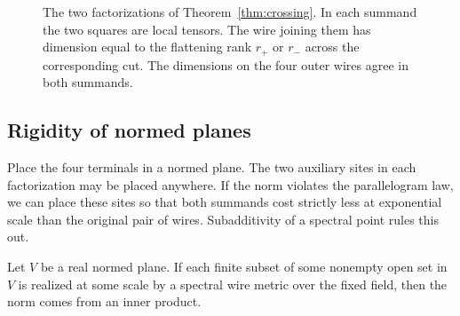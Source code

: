 \begin{figure}[htbp]
\centering
{}
\caption{The two factorizations of Theorem~\ref{thm:crossing}.
In each summand the two squares are local tensors. The wire joining
them has dimension equal to the flattening rank $r_+$ or $r_-$ across
the corresponding cut. The dimensions on the four outer wires agree in
both summands.}\label{fig:crossing-cuts}
\end{figure}



\subsection{Rigidity of normed planes}

Place the four terminals in a normed plane. The two auxiliary sites in
each factorization may be placed anywhere. If the norm violates the
parallelogram law, we can place these sites so that both summands cost
strictly less at exponential scale than the original pair of wires.
Subadditivity of a spectral point rules this out.
\begin{lemma}\label{lem:norm}
Let $V$ be a real normed plane. If each finite subset of some
nonempty open set in $V$ is realized at some scale by a spectral wire
metric over the fixed field, then the norm comes from an inner product.
\end{lemma}

